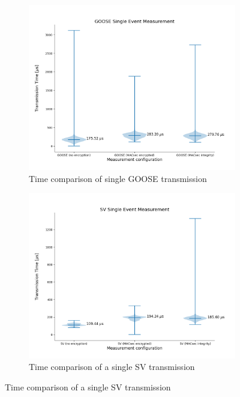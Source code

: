 \documentclass[conference, onecolumn, a4paper]{IEEEtran}
\begin{document}
\begin{figure}[h]
    \centering
    \begin{subfigure}[b]{0.49\textwidth}
        \centering
        \includegraphics[width=\textwidth]{images/GOOSE_group_all_configs.png}
        \caption{Time comparison of single GOOSE transmission}
        \label{imgae:GOOSETimings}
    \end{subfigure}
    \hfill
    \begin{subfigure}[b]{0.49\textwidth}
        \centering
        \includegraphics[width=\textwidth]{images/SV_group_all_configs.png}
        \caption{Time comparison of a single SV transmission}
        \label{image:SVTimings}
    \end{subfigure}
\end{figure}
\end{document}
